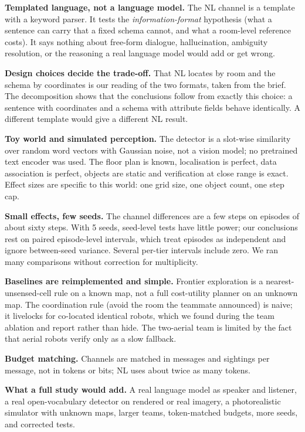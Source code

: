 \textbf{Templated language, not a language model.} The NL channel is a template with a keyword parser. It tests the \emph{information-format} hypothesis (what a sentence can carry that a fixed schema cannot, and what a room-level reference costs). It says nothing about free-form dialogue, hallucination, ambiguity resolution, or the reasoning a real language model would add or get wrong.

\textbf{Design choices decide the trade-off.} That NL locates by room and the schema by coordinates is our reading of the two formats, taken from the brief. The decomposition shows that the conclusions follow from exactly this choice: a sentence with coordinates and a schema with attribute fields behave identically. A different template would give a different NL result.

\textbf{Toy world and simulated perception.} The detector is a slot-wise similarity over random word vectors with Gaussian noise, not a vision model; no pretrained text encoder was used. The floor plan is known, localisation is perfect, data association is perfect, objects are static and verification at close range is exact. Effect sizes are specific to this world: one grid size, one object count, one step cap.

\textbf{Small effects, few seeds.} The channel differences are a few steps on episodes of about sixty steps. With 5 seeds, seed-level tests have little power; our conclusions rest on paired episode-level intervals, which treat episodes as independent and ignore between-seed variance. Several per-tier intervals include zero. We ran many comparisons without correction for multiplicity.

\textbf{Baselines are reimplemented and simple.} Frontier exploration is a nearest-unsensed-cell rule on a known map, not a full cost-utility planner on an unknown map. The coordination rule (avoid the room the teammate announced) is naive; it livelocks for co-located identical robots, which we found during the team ablation and report rather than hide. The two-aerial team is limited by the fact that aerial robots verify only as a slow fallback.

\textbf{Budget matching.} Channels are matched in messages and sightings per message, not in tokens or bits; NL uses about twice as many tokens.

\textbf{What a full study would add.} A real language model as speaker and listener, a real open-vocabulary detector on rendered or real imagery, a photorealistic simulator with unknown maps, larger teams, token-matched budgets, more seeds, and corrected tests.

